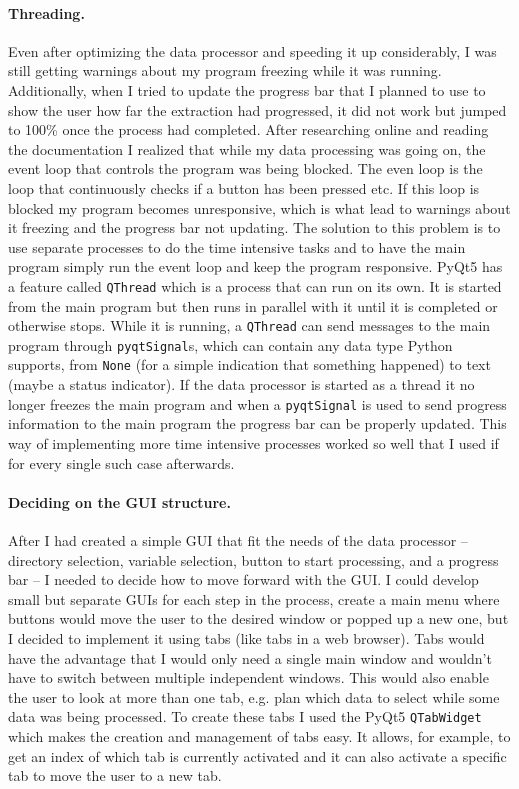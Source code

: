 \documentclass[../00_main.tex]{subfiles}
\begin{document}
\paragraph{Threading.} Even after optimizing the data processor and speeding it
up considerably, I was still getting warnings about my program freezing while
it was running. Additionally, when I tried to update the progress bar that
I planned to use to show the user how far the extraction had progressed, it did
not work but jumped to 100\% once the process had completed. After researching
online and reading the documentation I realized that while my data processing
was going on, the event loop that controls the program was being blocked. The
even loop is the loop that continuously checks if a button has been pressed
etc. If this loop is blocked my program becomes unresponsive, which is what
lead to warnings about it freezing and the progress bar not updating. The
solution to this problem is to use separate processes to do the time intensive
tasks and to have the main program simply run the event loop and keep the
program responsive. PyQt5 has a feature called \texttt{QThread} which is
a process that can run on its own. It is started from the main program but then
runs in parallel with it until it is completed or otherwise stops. While it is
running, a \texttt{QThread} can send messages to the main program through
\texttt{pyqtSignal}s, which can contain any data type Python supports, from
\texttt{None} (for a simple indication that something happened) to text (maybe
a status indicator). If the data processor is started as a thread it no longer
freezes the main program and when a \texttt{pyqtSignal} is used to send
progress information to the main program the progress bar can be properly
updated. This way of implementing more time intensive processes worked so well
that I used if for every single such case afterwards.

\paragraph{Deciding on the GUI structure.} After I had created a simple GUI
that fit the needs of the data processor -- directory selection, variable
selection, button to start processing, and a progress bar -- I needed to decide
how to move forward with the GUI. I could develop small but separate GUIs for
each step in the process, create a main menu where buttons would move the user
to the desired window or popped up a new one, but I decided to implement it
using tabs (like tabs in a web browser). Tabs would have the advantage that
I would only need a single main window and wouldn't have to switch between
multiple independent windows. This would also enable the user to look at more
than one tab, e.g. plan which data to select while some data was being
processed. To create these tabs I used the PyQt5 \texttt{QTabWidget} which
makes the creation and management of tabs easy. It allows, for example, to get
an index of which tab is currently activated and it can also activate
a specific tab to move the user to a new tab.
\end{document}
